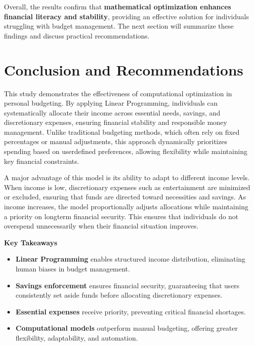 \documentclass{article}
\begin{document}
Overall, the results confirm that \textbf{mathematical optimization enhances financial literacy and stability}, providing an effective solution for individuals struggling with budget management. The next section will summarize these findings and discuss practical recommendations.
\section{Conclusion and Recommendations}
This study demonstrates the effectiveness of computational optimization in personal budgeting. By applying Linear Programming, individuals can systematically allocate their income across essential needs, savings, and discretionary expenses, ensuring financial stability and responsible money management. Unlike traditional budgeting methods, which often rely on fixed percentages or manual adjustments, this approach dynamically prioritizes spending based on userdefined preferences, allowing flexibility while maintaining key financial constraints.

A major advantage of this model is its ability to adapt to different income levels. When income is low, discretionary expenses such as entertainment are minimized or excluded, ensuring that funds are directed toward necessities and savings. As income increases, the model proportionally adjusts allocations while maintaining a priority on longterm financial security. This ensures that individuals do not overspend unnecessarily when their financial situation improves.

\textbf{Key Takeaways}
\begin{itemize}
    \item \textbf{Linear Programming} enables structured income distribution, eliminating human biases in budget management.
    \item \textbf{Savings enforcement} ensures financial security, guaranteeing that users consistently set aside funds before allocating discretionary expenses.
    \item \textbf{Essential expenses} receive priority, preventing critical financial shortages.
    \item \textbf{Computational models} outperform manual budgeting, offering greater flexibility, adaptability, and automation.
\end{itemize}
\end{document}
